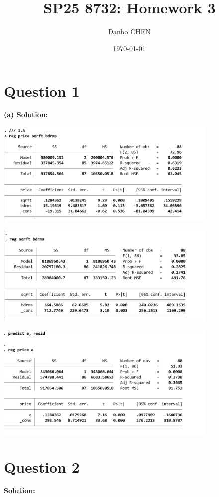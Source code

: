 \documentclass[12pt, oneside]{article}
\title{SP25 8732: Homework 3}
\author{Danbo CHEN}
\date{\today}
\begin{document}
\maketitle
\vspace{.25in}

\section{Question 1}
\textbf{(a) Solution:}

\begin{center}
    
    \includegraphics[width=0.8\textwidth]{Figure/P1.A.jpg}

    \includegraphics[width=0.8\textwidth]{Figure/P1.B.jpg}

    \includegraphics[width=0.8\textwidth]{Figure/P1.C.jpg}

\end{center}


\section{Question 2}
\textbf{Solution:}
\end{document}
